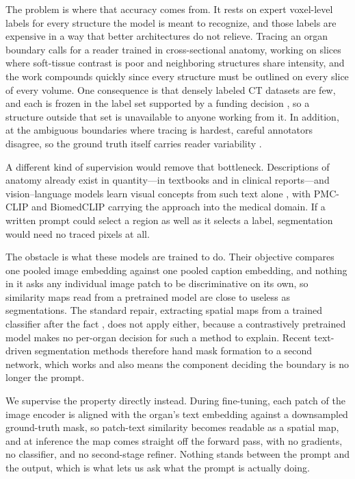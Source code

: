 \documentclass[10pt]{article}
\begin{document}
The problem is where that accuracy comes from. It rests on expert voxel-level
labels for every structure the model is meant to recognize, and those labels are
expensive in a way that better architectures do not relieve. Tracing an organ
boundary calls for a reader trained in cross-sectional anatomy, working on slices
where soft-tissue contrast is poor and neighboring structures share intensity, and
the work compounds quickly since every structure must be outlined on every slice of
every volume. One consequence is that densely labeled CT datasets are few, and
each is frozen in the label set supported by a funding decision
\cite{ji2022amos, luo2022word, rister2020ctorg}, so a structure outside that
set is unavailable to anyone working from it. In addition, at the ambiguous
boundaries where tracing is hardest, careful annotators disagree, so the ground
truth itself carries reader variability \cite{nikolov2021nsd}.

A different kind of supervision would remove that bottleneck. Descriptions of
anatomy already exist in quantity---in textbooks and in clinical reports---and
vision--language models learn visual concepts from such text alone
\cite{radford2021clip, zhai2023siglip}, with PMC-CLIP \cite{lin2023pmcclip} and
BiomedCLIP \cite{zhang2025biomedclip} carrying the approach into the medical
domain. If a written prompt could select a region as well as it selects a label,
segmentation would need no traced pixels at all.

The obstacle is what these models are trained to do. Their objective compares one
pooled image embedding against one pooled caption embedding, and nothing in it
asks any individual image patch to be discriminative on its own, so similarity
maps read from a pretrained model are close to useless as segmentations. The
standard repair, extracting spatial maps from a trained classifier after the fact
\cite{zhou2016cam, selvaraju2017gradcam}, does not apply either, because a
contrastively pretrained model makes no per-organ decision for such a method to
explain. Recent text-driven segmentation methods therefore hand mask formation to
a second network, which works and also means the component deciding the boundary
is no longer the prompt.

We supervise the property directly instead. During fine-tuning, each patch of the
image encoder is aligned with the organ's text embedding against a downsampled
ground-truth mask, so patch-text similarity becomes readable as a spatial map, and
at inference the map comes straight off the forward pass, with no gradients, no
classifier, and no second-stage refiner. Nothing stands between the prompt and the
output, which is what lets us ask what the prompt is actually doing.
\end{document}
